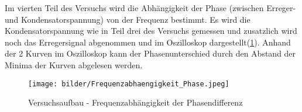 Im vierten Teil des Versuchs wird die Abhängigkeit der Phase (zwischen Erreger- und Kondensatorspannung) von der Frequenz bestimmt.
Es wird die Kondensatorspannung wie in Teil drei des Versuchs gemessen und zusatzlich wird noch das Erregersignal abgenommen und im Oszilloskop dargestellt(\ref{fig:Aufbau3}).
Anhand der 2 Kurven im Oszilloskop kann der Phasenunterschied durch den Abstand der Minima der Kurven abgelesen werden.

\begin{figure}
    \centering
    \texttt{[image: bilder/Frequenzabhaengigkeit\_Phase.jpeg]}
    \caption{Versuchsaufbau - Frequenzabhängigkeit der Phasendifferenz \cite[296]{Anleitung}}
    \label{fig:Aufbau3}
\end{figure}